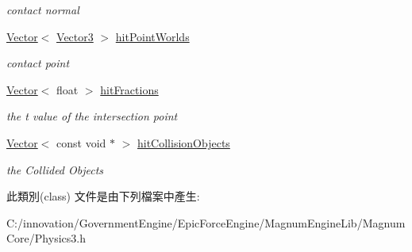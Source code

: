 \begin{DoxyCompactItemize}
\begin{DoxyCompactList}\small\item\em contact normal \end{DoxyCompactList}\item 
\hyperlink{class_i_dream_sky_1_1_vector}{Vector}$<$ \hyperlink{class_i_dream_sky_1_1_vector3}{Vector3} $>$ \hyperlink{class_i_dream_sky_1_1_physics3_1_1_convex_cast_result_a89da9e386b1ba6e830002e5da8de16dc}{hit\+Point\+Worlds}\hypertarget{class_i_dream_sky_1_1_physics3_1_1_convex_cast_result_a89da9e386b1ba6e830002e5da8de16dc}{}\label{class_i_dream_sky_1_1_physics3_1_1_convex_cast_result_a89da9e386b1ba6e830002e5da8de16dc}

\begin{DoxyCompactList}\small\item\em contact point \end{DoxyCompactList}\item 
\hyperlink{class_i_dream_sky_1_1_vector}{Vector}$<$ float $>$ \hyperlink{class_i_dream_sky_1_1_physics3_1_1_convex_cast_result_a187019f690ba869fc6927300d5fb510a}{hit\+Fractions}\hypertarget{class_i_dream_sky_1_1_physics3_1_1_convex_cast_result_a187019f690ba869fc6927300d5fb510a}{}\label{class_i_dream_sky_1_1_physics3_1_1_convex_cast_result_a187019f690ba869fc6927300d5fb510a}

\begin{DoxyCompactList}\small\item\em the t value of the intersection point \end{DoxyCompactList}\item 
\hyperlink{class_i_dream_sky_1_1_vector}{Vector}$<$ const void $\ast$ $>$ \hyperlink{class_i_dream_sky_1_1_physics3_1_1_convex_cast_result_a452a2295cba4cb0212e54a0145399451}{hit\+Collision\+Objects}\hypertarget{class_i_dream_sky_1_1_physics3_1_1_convex_cast_result_a452a2295cba4cb0212e54a0145399451}{}\label{class_i_dream_sky_1_1_physics3_1_1_convex_cast_result_a452a2295cba4cb0212e54a0145399451}

\begin{DoxyCompactList}\small\item\em the Collided Objects \end{DoxyCompactList}\end{DoxyCompactItemize}


此類別(class) 文件是由下列檔案中產生\+:\begin{DoxyCompactItemize}
\item 
C\+:/innovation/\+Government\+Engine/\+Epic\+Force\+Engine/\+Magnum\+Engine\+Lib/\+Magnum\+Core/Physics3.\+h\end{DoxyCompactItemize}

